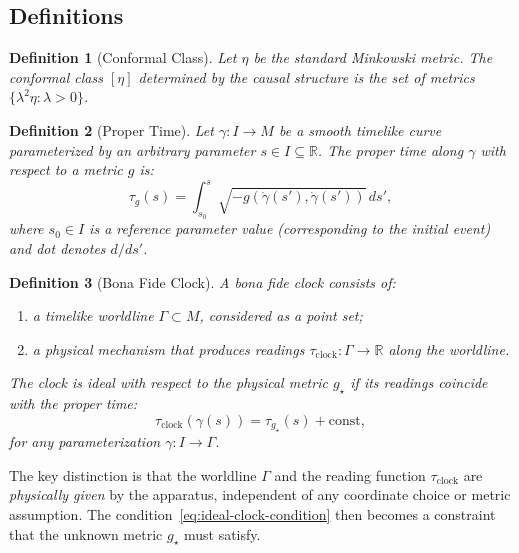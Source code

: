 \documentclass[aps,prd,twocolumn,nofootinbib,superscriptaddress]{revtex4-2}
\newtheorem{definition}{Definition}
\begin{document}
\subsection{Definitions}

\begin{definition}[Conformal Class]
Let $\eta$ be the standard Minkowski metric. The \emph{conformal class} $[\eta]$ determined by the causal structure is the set of metrics $\{\lambda^2 \eta : \lambda > 0\}$.
\end{definition}

\begin{definition}[Proper Time]
Let $\gamma: I \to M$ be a smooth timelike curve parameterized by an arbitrary parameter $s \in I \subseteq \mathbb{R}$. The \emph{proper time} along $\gamma$ with respect to a metric $g$ is:
\begin{equation}
\tau_g(s) = \int_{s_0}^{s} \sqrt{-g(\dot{\gamma}(s'), \dot{\gamma}(s'))} \, ds',
\label{eq:proper-time-integral}
\end{equation}
where $s_0 \in I$ is a reference parameter value (corresponding to the initial event) and dot denotes $d/ds'$.
\end{definition}

\begin{definition}[Bona Fide Clock]
A \emph{bona fide clock} consists of:
\begin{enumerate}
    \item a timelike worldline $\Gamma \subset M$, considered as a point set;
    \item a physical mechanism that produces readings $\tau_{\mathrm{clock}}: \Gamma \to \mathbb{R}$ along the worldline.
\end{enumerate}
The clock is \emph{ideal} with respect to the physical metric $g_\star$ if its readings coincide with the proper time:
\begin{equation}
\tau_{\mathrm{clock}}(\gamma(s)) = \tau_{g_\star}(s) + \mathrm{const},
\label{eq:ideal-clock-condition}
\end{equation}
for any parameterization $\gamma: I \to \Gamma$.
\end{definition}

The key distinction is that the worldline $\Gamma$ and the reading function $\tau_{\mathrm{clock}}$ are \emph{physically given} by the apparatus, independent of any coordinate choice or metric assumption. The condition~\eqref{eq:ideal-clock-condition} then becomes a constraint that the unknown metric $g_\star$ must satisfy.
\end{document}
